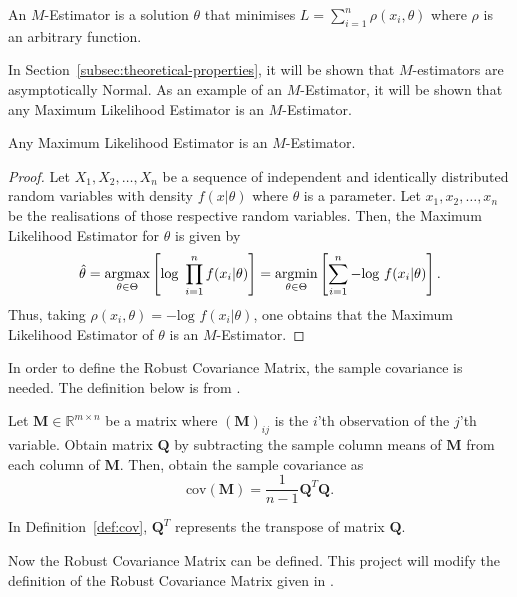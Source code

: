 \begin{definition}
    An $M$-Estimator is a solution $\theta$ that minimises $L = \sum_{i=1}^n \rho(x_i, \theta)$ where $\rho$ is an arbitrary function.
\end{definition}

In Section~\ref{subsec:theoretical-properties}, it will be shown that $M$-estimators are asymptotically Normal. As an example of an $M$-Estimator, it will be shown that any Maximum Likelihood Estimator is an $M$-Estimator.

\begin{proposition}
    \label{prop:mle-is-m}
    Any Maximum Likelihood Estimator is an $M$-Estimator.
\end{proposition}

\begin{proof}
Let $X_1, X_2, \ldots, X_n$ be a sequence of independent and identically distributed random variables with density $f(x|\theta)$ where $\theta$ is a parameter. Let $x_1, x_2, \ldots, x_n$ be the realisations of those  respective random variables. Then, the Maximum Likelihood Estimator for $\theta$ is given by
\[ \hat{\theta} = \argmax_{\theta\in \Theta} \left[ \text{log }  \prod_{i=1}^n f(x_i|\theta) \right] = \argmin_{\theta\in \Theta} \left[ \sum_{i=1}^n -\text{log } f(x_i|\theta) \right].\]
Thus, taking $\rho(x_i, \theta) = -\text{log } f(x_i | \theta)$, one obtains that the Maximum Likelihood Estimator of $\theta$ is an $M$-Estimator.
\end{proof}

In order to define the Robust Covariance Matrix, the sample covariance is needed. The definition below is from \cite{krzanowski_2000}. 

\begin{definition}
    \label{def:cov}
    Let $\pmb{M} \in \mathbb{R}^{m \times n}$ be a matrix where $(\pmb{M})_{ij}$ is the $i$'th observation of the $j$'th variable. Obtain matrix $\pmb{Q}$ by subtracting the sample column means of $\pmb{M}$ from each column of $\pmb{M}$. Then, obtain the sample covariance as
    \[ \text{cov}(\pmb{M}) = \frac{1}{n-1} \pmb{Q}^T \pmb{Q}. \]
\end{definition}

In Definition~\ref{def:cov}, $\pmb{Q}^T$ represents the transpose of matrix $\pmb{Q}$.

Now the Robust Covariance Matrix can be defined. This project will modify the definition of the Robust Covariance Matrix given in \cite{huber_1967}.

